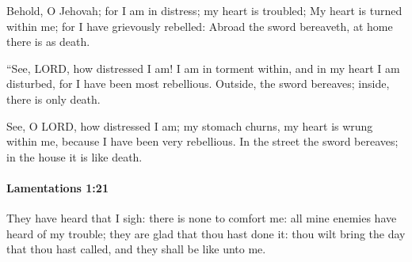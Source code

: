 			\begin{versebox}
					\item[BHS] 
					\item[LXX] 
					\item[ASV] Behold, O Jehovah; for I am in distress; my heart is troubled; My heart is turned within me; for I have grievously rebelled: Abroad the sword bereaveth, at home there is as death.
					\item[NIV] “See, LORD, how distressed I am! I am in torment within, and in my heart I am disturbed, for I have been most rebellious. Outside, the sword bereaves; inside, there is only death.
					\item[NRSV] See, O LORD, how distressed I am; my stomach churns, my heart is wrung within me, because I have been very rebellious. In the street the sword bereaves; in the house it is like death.
			\end{versebox}

		\paragraph{Lamentations 1:21} %
			\label{LAMENTATIONS-1-21}

			They have heard that I sigh: there is none to comfort me: all mine enemies have heard of my trouble; they are glad that thou hast done it: thou wilt bring the day that thou hast called, and they shall be like unto me.

